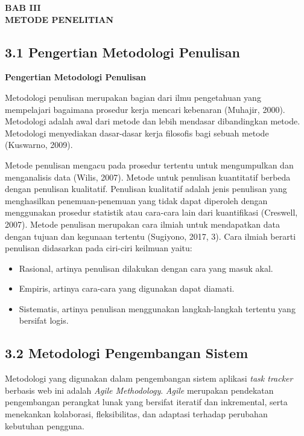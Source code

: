 \begin{center}
    \textbf{BAB III} \\[0.5em]
    \textbf{METODE PENELITIAN}
\end{center}

\subsection*{3.1 Pengertian Metodologi Penulisan}
\textbf{Pengertian Metodologi Penulisan}

Metodologi penulisan merupakan bagian dari ilmu pengetahuan yang mempelajari bagaimana prosedur kerja mencari kebenaran (Muhajir, 2000). Metodologi adalah awal dari metode dan lebih mendasar dibandingkan metode. Metodologi menyediakan dasar-dasar kerja filosofis bagi sebuah metode (Kuswarno, 2009).

Metode penulisan mengacu pada prosedur tertentu untuk mengumpulkan dan menganalisis data (Wilis, 2007). Metode untuk penulisan kuantitatif berbeda dengan penulisan kualitatif. Penulisan kualitatif adalah jenis penulisan yang menghasilkan penemuan-penemuan yang tidak dapat diperoleh dengan menggunakan prosedur statistik atau cara-cara lain dari kuantifikasi (Creswell, 2007). Metode penulisan merupakan cara ilmiah untuk mendapatkan data dengan tujuan dan kegunaan tertentu (Sugiyono, 2017, 3). Cara ilmiah berarti penulisan didasarkan pada ciri-ciri keilmuan yaitu:
\begin{itemize}
    \item Rasional, artinya penulisan dilakukan dengan cara yang masuk akal.
    \item Empiris, artinya cara-cara yang digunakan dapat diamati.
    \item Sistematis, artinya penulisan menggunakan langkah-langkah tertentu yang bersifat logis.
\end{itemize}

\subsection*{3.2 Metodologi Pengembangan Sistem}
Metodologi yang digunakan dalam pengembangan sistem aplikasi \textit{task tracker} berbasis web ini adalah \textit{Agile Methodology}. \textit{Agile} merupakan pendekatan pengembangan perangkat lunak yang bersifat iteratif dan inkremental, serta menekankan kolaborasi, fleksibilitas, dan adaptasi terhadap perubahan kebutuhan pengguna.

